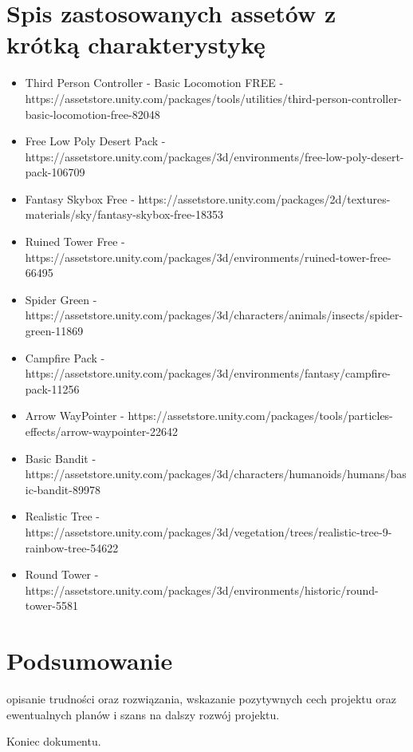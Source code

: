 \documentclass[10pt,a4paper]{article}
\begin{document}
\section{Spis zastosowanych assetów z krótką charakterystykę}
\begin{itemize}
  \item Third Person Controller - Basic Locomotion FREE - https://assetstore.unity.com/packages/tools/utilities/third-person-controller-basic-locomotion-free-82048
  \item Free Low Poly Desert Pack - https://assetstore.unity.com/packages/3d/environments/free-low-poly-desert-pack-106709
  \item Fantasy Skybox Free - https://assetstore.unity.com/packages/2d/textures-materials/sky/fantasy-skybox-free-18353
  \item Ruined Tower Free - https://assetstore.unity.com/packages/3d/environments/ruined-tower-free-66495
  \item Spider Green - https://assetstore.unity.com/packages/3d/characters/animals/insects/spider-green-11869
  \item Campfire Pack - https://assetstore.unity.com/packages/3d/environments/fantasy/campfire-pack-11256
  \item Arrow WayPointer - https://assetstore.unity.com/packages/tools/particles-effects/arrow-waypointer-22642
  \item Basic Bandit - https://assetstore.unity.com/packages/3d/characters/humanoids/humans/basic-bandit-89978
  \item Realistic Tree - https://assetstore.unity.com/packages/3d/vegetation/trees/realistic-tree-9-rainbow-tree-54622
  \item Round Tower - https://assetstore.unity.com/packages/3d/environments/historic/round-tower-5581
\end{itemize}

\clearpage
\section{Podsumowanie}
opisanie trudności oraz rozwiązania, wskazanie pozytywnych cech projektu oraz ewentualnych planów i szans na dalszy rozwój projektu.


\noindent\makebox[\linewidth]{\rule{0.6\paperwidth}{0.4pt}}
\begin{center}
	Koniec dokumentu.
\end{center}
\end{document}
